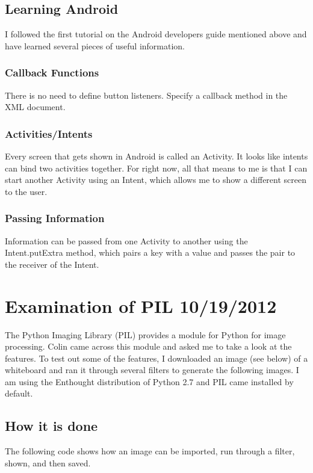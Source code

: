 \documentclass[]{article}
\begin{document}
			\subsection{Learning Android}
				I followed the first tutorial on the Android developers guide mentioned above and have learned several pieces of useful information.
				
				\subsubsection{Callback Functions}
					There is no need to define button listeners. Specify a callback method in the XML document. 
					
				\subsubsection{Activities/Intents}
					Every screen that gets shown in Android is called an Activity. It looks like intents can bind two activities together. For right now, all that means to me is that I can start another Activity using an Intent, which allows me to show a different screen to the user.
					
				\subsubsection{Passing Information}
					Information can be passed from one Activity to another using the Intent.putExtra method, which pairs a key with a value and passes the pair to the receiver of the Intent.
	
	
	
	\section{Examination of PIL 10/19/2012}
		The Python Imaging Library (PIL)  provides a module for Python for image processing. Colin came across this module and asked me to take a look at the features. To test out some of the features, I downloaded an image (see below) of a whiteboard and ran it through several filters to generate the following images. I am using the Enthought distribution of Python 2.7 and PIL came installed by default.
	
		
		\subsection{How it is done}
			The following code shows how an image can be imported, run through a filter, shown, and then saved.
			
\end{document}
